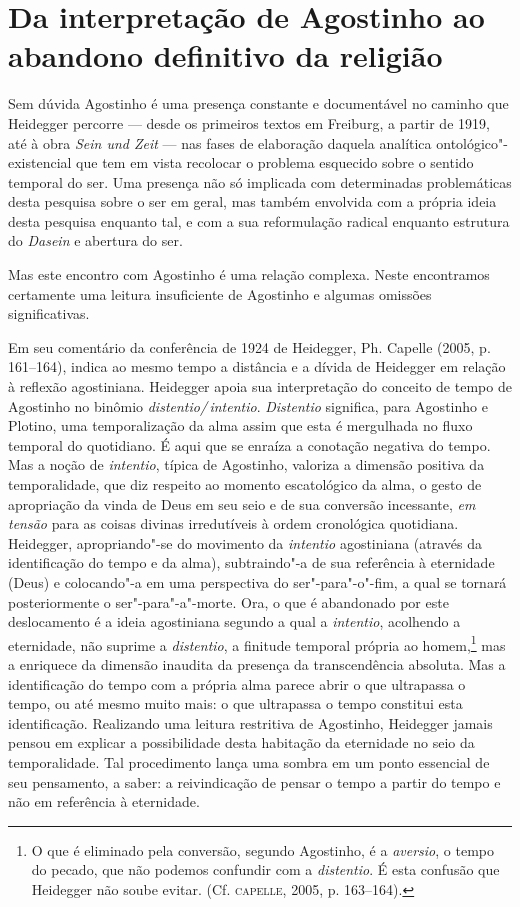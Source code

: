 \section{Da interpretação de Agostinho ao abandono definitivo
da religião} 

Sem dúvida Agostinho é uma presença constante e documentável no
caminho que Heidegger percorre --- desde os primeiros textos em Freiburg,
a partir de 1919, até à obra \emph{Sein und Zeit} --- nas fases
de elaboração daquela analítica ontológico"-existencial que tem
em vista recolocar o problema esquecido sobre o sentido temporal
do ser. Uma presença não só implicada com determinadas
problemáticas desta pesquisa sobre o ser em geral, mas também
envolvida com a própria ideia desta pesquisa enquanto tal, e com
a sua reformulação radical enquanto estrutura do \emph{Dasein}
e abertura do ser. 

Mas este encontro com Agostinho é uma relação complexa. Neste
encontramos certamente uma leitura insuficiente de Agostinho e
algumas omissões significativas.  

 Em seu comentário da conferência de 1924 de Heidegger, Ph.
Capelle (2005, p. 161--164), indica ao mesmo tempo a
distância e a dívida de Heidegger em relação à reflexão
agostiniana. Heidegger apoia sua interpretação do conceito de
tempo de Agostinho no binômio \emph{distentio/\,intentio}.
\emph{Distentio} significa, para Agostinho e Plotino, uma
temporalização da alma assim que esta é mergulhada no fluxo
temporal do quotidiano. É aqui que se enraíza a conotação
negativa do tempo. Mas a noção de \emph{intentio}, típica de
Agostinho, valoriza a dimensão positiva da temporalidade, que
diz respeito ao momento escatológico da alma, o gesto de
apropriação da vinda de Deus em seu seio e de sua conversão
incessante, \emph{em tensão} para as coisas divinas
irredutíveis à ordem cronológica quotidiana. Heidegger,
apropriando"-se do movimento da \emph{intentio} agostiniana
(através da identificação do tempo e da alma), subtraindo"-a de
sua referência à eternidade (Deus) e colocando"-a em uma
perspectiva do ser"-para"-o"-fim, a qual se tornará posteriormente
o ser"-para"-a"-morte. Ora, o que é abandonado por este
deslocamento é a ideia agostiniana segundo a qual a
\emph{intentio}, acolhendo a eternidade, não suprime a
\emph{distentio}, a finitude temporal própria ao
homem,\footnote{   O que é eliminado pela conversão, segundo
Agostinho, é a \emph{aversio}, o tempo do pecado, que não
podemos confundir com a \emph{distentio}. É esta confusão que
Heidegger não soube evitar. (Cf. \textsc{capelle}, 2005, p. 163--164).} 
mas a enriquece da dimensão inaudita da presença da
transcendência absoluta. Mas a identificação do tempo com a
própria alma parece abrir o que ultrapassa o tempo, ou até mesmo
muito mais: o que ultrapassa o tempo constitui esta
identificação. Realizando uma leitura restritiva de Agostinho,
Heidegger jamais pensou em explicar a possibilidade desta
habitação da eternidade no seio da temporalidade. Tal
procedimento lança uma sombra em um ponto essencial de seu
pensamento, a saber: a reivindicação de pensar o tempo a partir
do tempo e não em referência à eternidade.  

